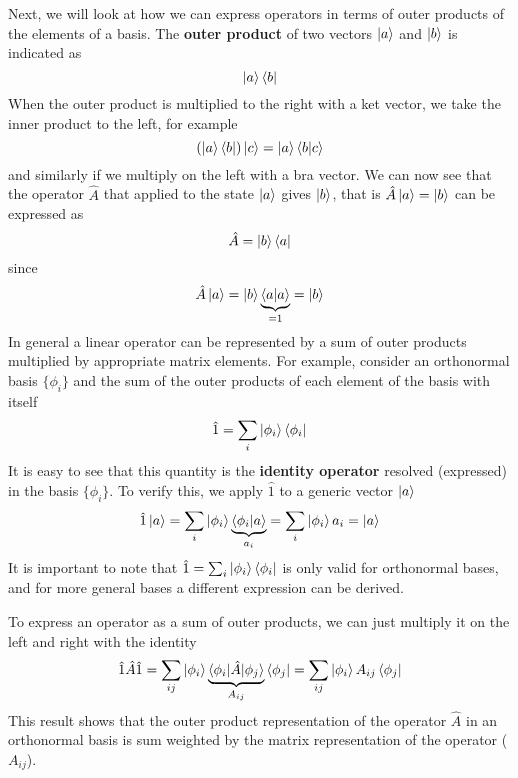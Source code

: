\documentclass[../Main/chem532-notes.tex]{subfiles}
\begin{document}
Next, we will look at how we can express operators in terms of outer products of the elements of a basis.
The \textbf{outer product} of two vectors $\ket{a}$ and $\ket{b}$ is indicated as
\begin{equation}
\ket{a}\bra{b}
\end{equation}
When the outer product is multiplied to the right with a ket vector, we take the inner product to the left, for example
\begin{equation}
(\ket{a}\bra{b}) \ket{c} = \ket{a} \braket{b|c}
\end{equation}
and similarly if we multiply on the left with a bra vector.
We can now see that the operator $\hat{A}$ that applied to the state $\ket{a}$ gives $\ket{b}$, that is $\hat{A}\ket{a} = \ket{b}$ can be expressed as
\begin{equation}
\hat{A} = \ket{b}\bra{a}
\end{equation}
since 
\begin{equation}
\hat{A} \ket{a} = \ket{b} \underbrace{\braket{a|a} }_{=1} = \ket{b}
\end{equation}
In general a linear operator can be represented by a sum of outer products multiplied by appropriate matrix elements.
For example, consider an orthonormal basis $\{ \phi_i \}$ and the sum of the outer products of each element of the basis with itself
\begin{equation}
\hat{1} = \sum_i \ket{\phi_i}\bra{\phi_i}
\end{equation}
It is easy to see that this quantity is the \textbf{identity operator} resolved (expressed) in the basis $\{ \phi_i \}$. To verify this, we apply $\hat{1}$ to a generic vector $\ket{a}$
\begin{equation}
\hat{1}\ket{a} = \sum_i \ket{\phi_i}\underbrace{\braket{\phi_i | a}}_{a_i}
= \sum_i \ket{\phi_i} a_i = \ket{a}
\end{equation}
It is important to note that $\hat{1} = \sum_i \ket{\phi_i}\bra{\phi_i}$ is only valid for orthonormal bases, and for more general bases a different expression can be derived. 

To express an operator as a sum of outer products, we can just multiply it on the left and right with the identity
\begin{equation}
\hat{1}\hat{A}\hat{1} = \sum_{ij} \ket{\phi_i}\underbrace{\braket{\phi_i | \hat{A} |\phi_j}}_{A_{ij}} \bra{\phi_j}
= \sum_{ij} \ket{\phi_i} A_{ij} \bra{\phi_j}
\end{equation}
This result shows that the outer product representation of the operator $\hat{A}$ in an orthonormal basis is sum weighted by the matrix representation of the operator ($ A_{ij}$).
\end{document}
